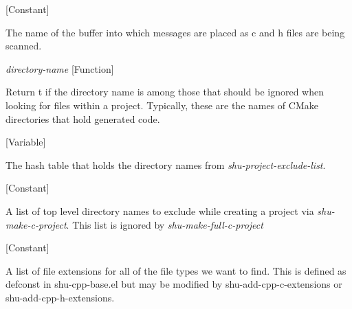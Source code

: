 \vspace{1em}
\noindent
{}
\usebox{\funcname}
 \hfill [Constant]

\begin{doc-string}
The name of the buffer into which messages are placed as c and h files
are being scanned.
\end{doc-string}

\vspace{1em}
\noindent
{}
\usebox{\funcname}\emph{directory-name}
 \hfill [Function]

\begin{doc-string}
Return t if the directory name is among those that should be ignored when
looking for files within a project.  Typically, these are the names of
CMake directories that hold generated code.
\end{doc-string}

\vspace{1em}
\noindent
{}
\usebox{\funcname}
 \hfill [Variable]

\begin{doc-string}
The hash table that holds the directory names from \emph{shu-project-exclude-list}.
\end{doc-string}

\vspace{1em}
\noindent
{}
\usebox{\funcname}
 \hfill [Constant]

\begin{doc-string}
A list of top level directory names to exclude while creating a project via
\emph{shu-make-c-project}.  This list is ignored by \emph{shu-make-full-c-project}
\end{doc-string}

\vspace{1em}
\noindent
{}
\usebox{\funcname}
 \hfill [Constant]

\begin{doc-string}
A list of file extensions for all of the file types we want to find.  This is defined
as defconst in shu-cpp-base.el but may be modified by shu-add-cpp-c-extensions or
shu-add-cpp-h-extensions.
\end{doc-string}

